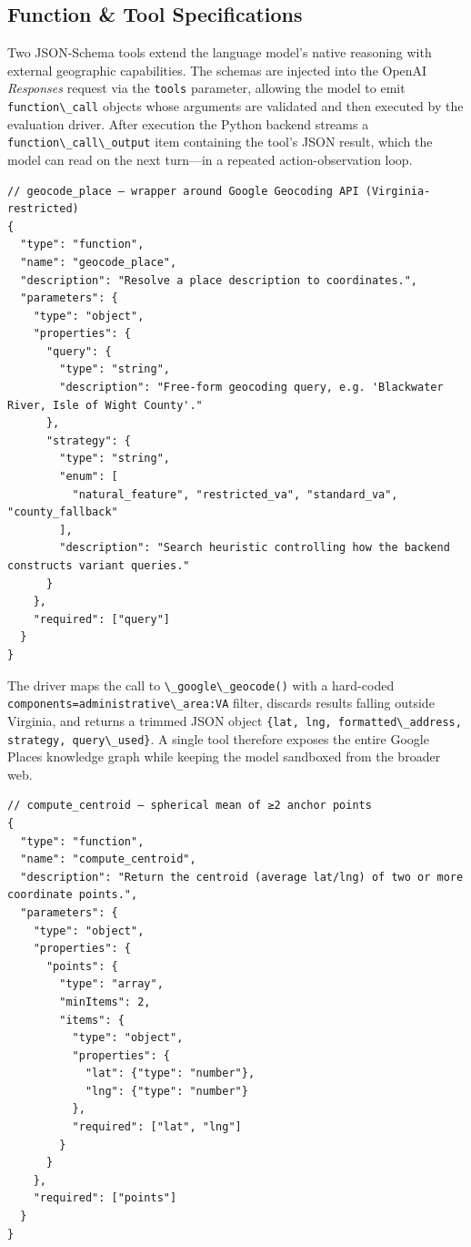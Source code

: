 \subsection{Function \& Tool
Specifications}\label{a.4-function-tool-specifications}

Two JSON-Schema tools extend the language model's native reasoning with
external geographic capabilities. The schemas are injected into the
OpenAI \emph{Responses} request via the \passthrough{\lstinline!tools!}
parameter, allowing the model to emit
\passthrough{\lstinline!function\_call!} objects whose arguments are
validated and then executed by the evaluation driver. After execution
the Python backend streams a
\passthrough{\lstinline!function\_call\_output!} item containing the
tool's JSON result, which the model can read on the next turn---in a
repeated action-observation loop.

\begin{lstlisting}
// geocode_place – wrapper around Google Geocoding API (Virginia-restricted)
{
  "type": "function",
  "name": "geocode_place",
  "description": "Resolve a place description to coordinates.",
  "parameters": {
    "type": "object",
    "properties": {
      "query": {
        "type": "string",
        "description": "Free-form geocoding query, e.g. 'Blackwater River, Isle of Wight County'."
      },
      "strategy": {
        "type": "string",
        "enum": [
          "natural_feature", "restricted_va", "standard_va", "county_fallback"
        ],
        "description": "Search heuristic controlling how the backend constructs variant queries."
      }
    },
    "required": ["query"]
  }
}
\end{lstlisting}

The driver maps the call to
\passthrough{\lstinline!\_google\_geocode()!} with a hard-coded
\passthrough{\lstinline!components=administrative\_area:VA!} filter,
discards results falling outside Virginia, and returns a trimmed JSON
object
\passthrough{\lstinline!\{lat, lng, formatted\_address, strategy, query\_used\}!}.
A single tool therefore exposes the entire Google Places knowledge graph
while keeping the model sandboxed from the broader web.

\begin{lstlisting}
// compute_centroid – spherical mean of ≥2 anchor points
{
  "type": "function",
  "name": "compute_centroid",
  "description": "Return the centroid (average lat/lng) of two or more coordinate points.",
  "parameters": {
    "type": "object",
    "properties": {
      "points": {
        "type": "array",
        "minItems": 2,
        "items": {
          "type": "object",
          "properties": {
            "lat": {"type": "number"},
            "lng": {"type": "number"}
          },
          "required": ["lat", "lng"]
        }
      }
    },
    "required": ["points"]
  }
}
\end{lstlisting}

